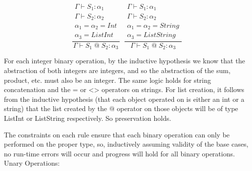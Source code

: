\documentclass[10pt]{article} %
\begin{document}
\begin{enumerate}
$$\frac{\begin{matrix}\Gamma \vdash S_1: \alpha_1\\ \Gamma \vdash S_2: \alpha_2 \\ \alpha_1 = \alpha_2 = Int\\ \alpha_3 = ListInt\end{matrix}}{\Gamma \vdash S_1 \;\texttt{@}\; S_2 : \alpha_3}\;\;
\frac{\begin{matrix}\Gamma \vdash S_1: \alpha_1\\ \Gamma \vdash S_2: \alpha_2 \\ \alpha_1 = \alpha_2 = String\\ \alpha_3 = ListString\end{matrix}}{\Gamma \vdash S_1 \;\texttt{@}\; S_2 : \alpha_3}$$

For each integer binary operation, by the inductive hypothesis we know that the abstraction of both integers are integers, and so the abstraction of the sum, product, etc. must also be an integer.  The same logic holds for string concatenation and the $\texttt{=}$ or $\texttt{<>}$ operators on strings.  For list creation, it follows from the inductive hypothesis (that each object operated on is either an int or a string) that the list created by the $\texttt{@}$ operator on those objects will be of type ListInt or ListString respectively.  So preservation holds.

The constraints on each rule ensure that each binary operation can only be performed on the proper type, so, inductively assuming validity of the base cases, no run-time errors will occur and progress will hold for all binary operations.\\

Unary Operations:


\end{enumerate}
\end{document}
